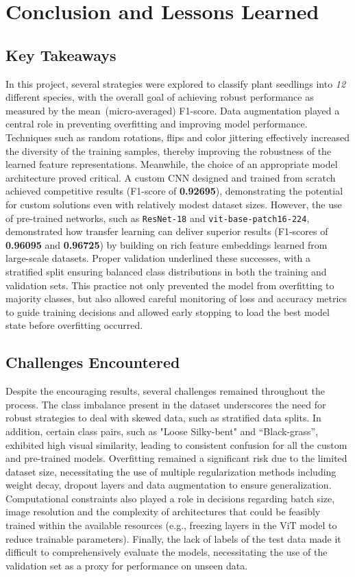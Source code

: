\section{Conclusion and Lessons Learned}

\subsection{Key Takeaways}

In this project, several strategies were explored to classify plant seedlings into \textit{12} different species, with the overall goal of achieving robust performance as measured by the mean~(micro-averaged) F1-score. Data augmentation played a central role in preventing overfitting and improving model performance. Techniques such as random rotations, flips and color jittering effectively increased the diversity of the training samples, thereby improving the robustness of the learned feature representations. Meanwhile, the choice of an appropriate model architecture proved critical. A custom CNN designed and trained from scratch achieved competitive results (F1-score of \textbf{0.92695}), demonstrating the potential for custom solutions even with relatively modest dataset sizes. However, the use of pre-trained networks, such as \texttt{ResNet-18} and \texttt{vit-base-patch16-224}, demonstrated how transfer learning can deliver superior results (F1-scores of \textbf{0.96095} and \textbf{0.96725}) by building on rich feature embeddings learned from large-scale datasets. Proper validation underlined these successes, with a stratified split ensuring balanced class distributions in both the training and validation sets. This practice not only prevented the model from overfitting to majority classes, but also allowed careful monitoring of loss and accuracy metrics to guide training decisions and allowed early stopping to load the best model state before overfitting occurred.

\subsection{Challenges Encountered}

Despite the encouraging results, several challenges remained throughout the process. The class imbalance present in the dataset underscores the need for robust strategies to deal with skewed data, such as stratified data splits. In addition, certain class pairs, such as "Loose Silky-bent" and ``Black-grass'', exhibited high visual similarity, leading to consistent confusion for all the custom and pre-trained models. Overfitting remained a significant risk due to the limited dataset size, necessitating the use of multiple regularization methods including weight decay, dropout layers and data augmentation to ensure generalization. Computational constraints also played a role in decisions regarding batch size, image resolution and the complexity of architectures that could be feasibly trained within the available resources (e.g., freezing layers in the ViT model to reduce trainable parameters). Finally, the lack of labels of the test data made it difficult to comprehensively evaluate the models, necessitating the use of the validation set as a proxy for performance on unseen data.

